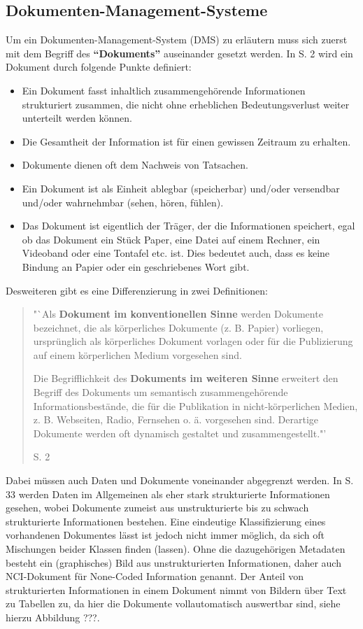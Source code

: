 \subsection{Dokumenten-Management-Systeme}

Um ein Dokumenten-Management-System (\gls{DMS})  zu erläutern muss sich zuerst mit dem Begriff des \textbf{"`Dokuments"'} auseinander gesetzt werden.
In \cite{DMS08} S. 2 wird ein Dokument durch folgende Punkte definiert:

\begin{itemize}
\item Ein Dokument fasst inhaltlich zusammengehörende Informationen strukturiert zusammen, die nicht ohne erheblichen Bedeutungsverlust weiter unterteilt werden können. 
\item Die Gesamtheit der Information ist für einen gewissen Zeitraum zu erhalten.
\item Dokumente dienen oft dem Nachweis von Tatsachen.
\item Ein Dokument ist als Einheit ablegbar (speicherbar) und/oder versendbar und/oder wahrnehmbar (sehen, hören, fühlen).
\item Das Dokument ist eigentlich der Träger, der die Informationen speichert, egal ob das Dokument ein Stück Paper, eine Datei auf einem Rechner, ein Videoband oder eine Tontafel etc. ist. Dies bedeutet auch, dass es keine Bindung an Papier oder ein geschriebenes Wort gibt.
\end{itemize}

Desweiteren gibt es eine Differenzierung in zwei Definitionen:

\begin{quote}"`Als \textbf{Dokument im konventionellen Sinne} werden Dokumente bezeichnet, die als körperliches Dokumente (z. B. Papier) vorliegen, ursprünglich als körperliches Dokument vorlagen oder für die Publizierung auf einem körperlichen Medium vorgesehen sind.

Die Begrifflichkeit des \textbf{Dokuments im weiteren Sinne} erweitert den Begriff des Dokuments um semantisch zusammengehörende Informationsbestände, die für die Publikation in nicht-körperlichen Medien, z. B. Webseiten, Radio, Fernsehen o. ä. vorgesehen sind. Derartige Dokumente werden oft dynamisch gestaltet und zusammengestellt."' \begin{flushright}\cite{DMS08} S. 2\end{flushright}\end{quote}

Dabei müssen auch Daten und Dokumente voneinander abgegrenzt werden.
In \cite{DMS08} S. 33 werden Daten im Allgemeinen als eher stark strukturierte Informationen gesehen, wobei Dokumente zumeist aus unstrukturierte bis zu schwach strukturierte Informationen bestehen.
Eine eindeutige Klassifizierung eines vorhandenen Dokumentes lässt ist jedoch nicht immer möglich, da sich oft Mischungen beider Klassen finden (lassen).
Ohne die dazugehörigen Metadaten besteht ein (graphisches) Bild aus unstrukturierten Informationen, daher auch \gls{NCI}-Dokument für None-Coded Information genannt.
Der Anteil von strukturierten Informationen in einem Dokument nimmt von Bildern über Text zu Tabellen zu, da hier die Dokumente vollautomatisch auswertbar sind, siehe hierzu Abbildung ???.

